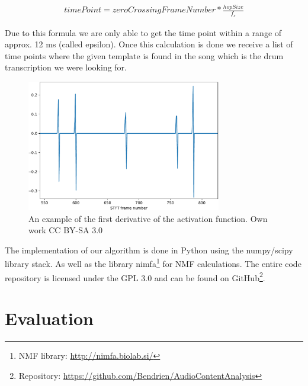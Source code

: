 \documentclass{article}
\begin{document}
\begin{align*}
\label{eq:timePoint}
timePoint = zeroCrossingFrameNumber * \frac{hopSize}{f_s}
\end{align*}

Due to this formula we are only able to get the time point within a range of approx. 12 ms (called epsilon).
Once this calculation is done we receive a list of time points where the given template is found in the song which is the drum transcription we were looking for.

\begin{figure}[htb]

\begin{minipage}[b]{1.0\linewidth}
  \centering
  \centerline{\includegraphics[width=8.5cm]{figures/Ableitung}}
  \medskip
\end{minipage}

\caption{An example of the first derivative of the activation function. \scriptsize{\textsf{\textcopyright} Own work CC BY-SA 3.0}}
\label{fig:Ableitung}

\end{figure}


The implementation of our algorithm is done in Python using the numpy/scipy library stack. 
As well as the library nimfa\footnote{NMF library: \url{http://nimfa.biolab.si/}} for NMF calculations.
The entire code repository is licensed under the GPL 3.0 and can be found on GitHub\footnote{Repository: \url{https://github.com/Bendrien/AudioContentAnalysis}}.




\section{Evaluation}
\label{sec:evaluation}
\end{document}

